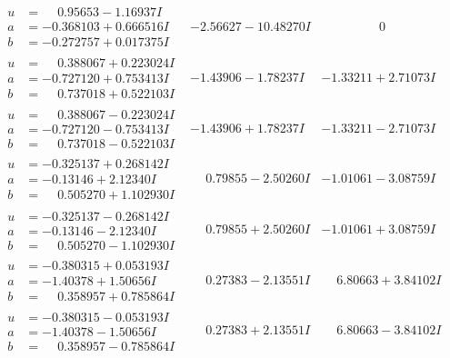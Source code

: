 \documentclass[1p]{elsarticle_modified}
\theoremstyle{definition}
\begin{document}
$$\begin{array}{c|c|c}
\begin{aligned}
u &= \phantom{-}0.95653 - 1.16937 I \\
a &= -0.368103 + 0.666516 I \\
b &= -0.272757 + 0.017375 I\end{aligned}
 & -2.56627 - 10.48270 I & \phantom{-0.000000 } 0 \\ \hline\begin{aligned}
u &= \phantom{-}0.388067 + 0.223024 I \\
a &= -0.727120 + 0.753413 I \\
b &= \phantom{-}0.737018 + 0.522103 I\end{aligned}
 & -1.43906 - 1.78237 I & -1.33211 + 2.71073 I \\ \hline\begin{aligned}
u &= \phantom{-}0.388067 - 0.223024 I \\
a &= -0.727120 - 0.753413 I \\
b &= \phantom{-}0.737018 - 0.522103 I\end{aligned}
 & -1.43906 + 1.78237 I & -1.33211 - 2.71073 I \\ \hline\begin{aligned}
u &= -0.325137 + 0.268142 I \\
a &= -0.13146 + 2.12340 I \\
b &= \phantom{-}0.505270 + 1.102930 I\end{aligned}
 & \phantom{-}0.79855 - 2.50260 I & -1.01061 - 3.08759 I \\ \hline\begin{aligned}
u &= -0.325137 - 0.268142 I \\
a &= -0.13146 - 2.12340 I \\
b &= \phantom{-}0.505270 - 1.102930 I\end{aligned}
 & \phantom{-}0.79855 + 2.50260 I & -1.01061 + 3.08759 I \\ \hline\begin{aligned}
u &= -0.380315 + 0.053193 I \\
a &= -1.40378 + 1.50656 I \\
b &= \phantom{-}0.358957 + 0.785864 I\end{aligned}
 & \phantom{-}0.27383 - 2.13551 I & \phantom{-}6.80663 + 3.84102 I \\ \hline\begin{aligned}
u &= -0.380315 - 0.053193 I \\
a &= -1.40378 - 1.50656 I \\
b &= \phantom{-}0.358957 - 0.785864 I\end{aligned}
 & \phantom{-}0.27383 + 2.13551 I & \phantom{-}6.80663 - 3.84102 I \\ \hline\begin{aligned}

\end{aligned}
\end{array}$$
\end{document}
